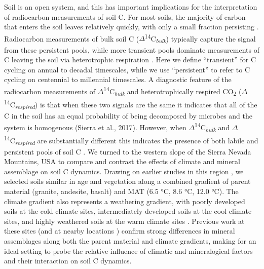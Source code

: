 \documentclass[soil, manuscript]{copernicus}
\begin{document}
Soil is an open system, and this has important implications for the
interpretation of radiocarbon measurements of soil C. For most soils,
the majority of carbon that enters the soil leaves relatively quickly,
with only a small fraction persisting \citep{sierra2018}. Radiocarbon
measurements of bulk soil C
(\(\Delta\)\textsuperscript{14}C\textsubscript{\emph{bulk}}) typically
capture the signal from these persistent pools, while more transient
pools dominate measurements of C leaving the soil via heterotrophic
respiration \citep{trumbore2000}. Here we define ``transient'' for C
cycling on annual to decadal timescales, while we use ``persistent'' to
refer to C cycling on centennial to millennial timescales. A diagnostic
feature of the radiocarbon measurements of
\(\Delta\)\textsuperscript{14}C\textsubscript{\emph{bulk}} and
heterotrophically respired CO\textsubscript{2}
(\(\Delta\)\textsuperscript{14}C\textsubscript{\emph{respired}}) is that
when these two signals are the same it indicates that all of the C in
the soil has an equal probability of being decomposed by microbes and
the system is homogenous (Sierra et al., 2017). However, when
\(\Delta\)\textsuperscript{14}C\textsubscript{\emph{bulk}} and
\(\Delta\)\textsuperscript{14}C\textsubscript{\emph{respired}} are
substantially different this indicates the presence of both labile and
persistent pools of soil C \citep{ewing2006, hopkins2012}. We turned to
the western slope of the Sierra Nevada Mountains, USA to compare and
contrast the effects of climate and mineral assemblage on soil C
dynamics. Drawing on earlier studies in this region
\citep{jenny1949, dahlgren1997, rasmussen2004, trumbore1996}, we
selected soils similar in age and vegetation along a combined gradient
of parent material (granite, andesite, basalt) and MAT (6.5 °C, 8.6 °C,
12.0 °C). The climate gradient also represents a weathering gradient,
with poorly developed soils at the cold climate sites, intermediately
developed soils at the cool climate sites, and highly weathered soils at
the warm climate sites \citep{harradine1958, rasmussen2010a}. Previous
work at these sites \citep{rasmussen2004, rasmussen2018b} (and at nearby
locations
\citetext{\citealp[\citet{koarashi2012}]{trumbore1996}; \citealp{dahlgren1997}; \citealp{castanha2008}})
confirm strong differences in mineral assemblages along both the parent
material and climate gradients, making for an ideal setting to probe the
relative influence of climatic and mineralogical factors and their
interaction on soil C dynamics.
\end{document}
